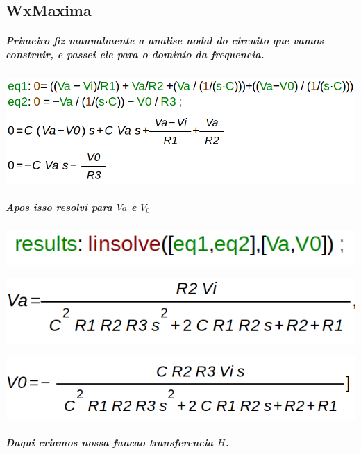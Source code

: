 \documentclass[12pt,twoside, a4paper, twocolumn]{article}
\begin{document}
\subsection{WxMaxima}

\subparagraph*{Primeiro fiz manualmente a analise nodal do circuito que vamos construir, e passei ele para o dominio da frequencia.}
\subparagraph*{}

\begin{adjustbox}{scale=0.26}
    \includegraphics{eqs.png}
\end{adjustbox}

\subparagraph*{Apos isso resolvi para $Va$ e $V_0$}

\subparagraph*{}

\begin{adjustbox}{scale=0.33}
    \includegraphics{linsolve.png}
\end{adjustbox}

\begin{adjustbox}{scale=0.33}
    \includegraphics{va.png}
\end{adjustbox}

\begin{adjustbox}{scale=0.33}
    \includegraphics{v0.png}
\end{adjustbox}

\subparagraph*{Daqui criamos nossa funcao transferencia $H$.}
\end{document}
